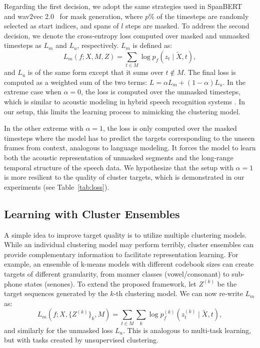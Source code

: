 Regarding the first decision, we adopt the same strategies used in SpanBERT~\cite{joshi2020spanbert} and wav2vec 2.0~\cite{baevski2020wav2vec} for mask generation, where $p$\% of the timesteps are randomly selected as start indices, and spans of $l$ steps are masked. To address the second decision, we denote the cross-entropy loss computed over masked and unmasked timesteps as $L_m$ and $L_u$, respectively. $L_m$ is defined as:
\begin{equation}
    L_m(f; X, M, Z) = \sum_{t \in M} \log p_f(z_t \mid \tilde{X}, t),
\end{equation}
and $L_u$ is of the same form except that it sums over $t \not\in M$.
The final loss is computed as a weighted sum of the two terms: $L = \alpha L_m + (1-\alpha)L_u$. In the extreme case when $\alpha = 0$, the loss is computed over the unmasked timesteps, which is similar to acoustic modeling in hybrid speech recognition systems \cite{young1996large, abdel2012applying, povey2005discriminative, bourlard2012connectionist}. In our setup, this limits the learning process to mimicking the clustering model. 

In the other extreme with $\alpha=1$, the loss is only computed over the masked timesteps where the model has to predict the targets corresponding to the unseen frames from context, analogous to language modeling. It forces the model to learn both the acoustic representation of unmasked segments and the long-range temporal structure of the speech data. We hypothesize that the setup with $\alpha=1$ is more resilient to the quality of cluster targets, which is demonstrated in our experiments (see Table~\ref{tab:loss}).

\subsection{Learning with Cluster Ensembles}
A simple idea to improve target quality is to utilize multiple clustering models. While an individual clustering model may perform terribly, cluster ensembles can provide complementary information to facilitate representation learning. For example, an ensemble of k-means models with different codebook sizes can create targets of different granularity, from manner classes (vowel/consonant) to sub-phone states (senones). 
To extend the proposed framework, let $Z^{(k)}$ be the target sequences generated by the $k$-th clustering model. We can now re-write $L_m$ as:
\begin{equation}
    L_m(f; X, \{ Z^{(k)} \}_k, M) = 
    \sum_{t \in M} \sum_{k} \log p_f^{(k)}(z_t^{(k)} \mid \tilde{X}, t), \label{eq:our_obj}
\end{equation}
and similarly for the unmasked loss $L_u$. This is analogous to multi-task learning, but with tasks created by unsupervised clustering.

